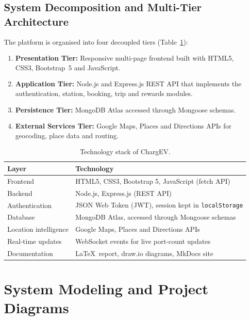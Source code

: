 \documentclass{tietreport}
\begin{document}
\subsection{System Decomposition and Multi-Tier Architecture}

The platform is organised into four decoupled tiers
(Table~\ref{tab:stack}):

\begin{enumerate}
  \item \textbf{Presentation Tier:} Responsive multi-page
    frontend built with HTML5, CSS3, Bootstrap~5 and
    JavaScript.
  \item \textbf{Application Tier:} Node.js and Express.js
    REST API that implements the authentication, station,
    booking, trip and rewards modules.
  \item \textbf{Persistence Tier:} MongoDB Atlas accessed
    through Mongoose schemas.
  \item \textbf{External Services Tier:} Google Maps,
    Places and Directions APIs for geocoding, place data
    and routing.
\end{enumerate}

\begin{table}[H]
  \centering
  \begin{tabularx}{\textwidth}{lX}
    \toprule
    \textbf{Layer} & \textbf{Technology} \\
    \midrule
    Frontend & HTML5, CSS3, Bootstrap 5, JavaScript (fetch API) \\
    Backend & Node.js, Express.js (REST API) \\
    Authentication & JSON Web Token (JWT), session kept in \texttt{localStorage} \\
    Database & MongoDB Atlas, accessed through Mongoose schemas \\
    Location intelligence & Google Maps, Places and Directions APIs \\
    Real-time updates & WebSocket events for live port-count updates \\
    Documentation & \LaTeX\ report, draw.io diagrams, MkDocs site \\
    \bottomrule
  \end{tabularx}
  \caption{Technology stack of ChargEV.}
  \label{tab:stack}
\end{table}

\section{System Modeling and Project Diagrams}
\end{document}
